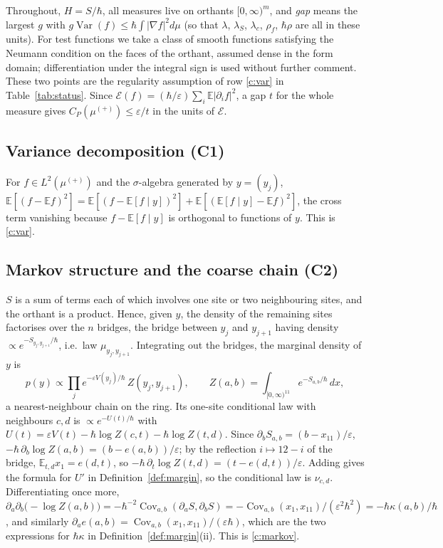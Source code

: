 \documentclass[11pt,a4paper]{article}
\theoremstyle{definition}
\theoremstyle{remark}
\newcommand{\hk}{\hbar\kappa}
\newcommand{\hr}{\hbar\rho}
\newcommand{\E}{\mathbb{E}}
\DeclareMathOperator{\Cov}{Cov}
\DeclareMathOperator{\Var}{Var}
\begin{document}
Throughout, $H=S/\hbar$, all measures live on orthants $[0,\infty)^m$, and \emph{gap} means the largest $g$ with $g\Var(f)\le\hbar\int|\nabla f|^2d\mu$ (so that $\lambda$, $\lambda_S$, $\lambda_c$, $\rho_f$, $\hr$ are all in these units). For test functions we take a class of smooth functions satisfying the Neumann condition on the faces of the orthant, assumed dense in the form domain; differentiation under the integral sign is used without further comment. These two points are the regularity assumption of row \ref{c:var} in Table~\ref{tab:status}. Since $\mathcal E(f)=(\hbar/\varepsilon)\sum_i\E|\partial_if|^2$, a gap $t$ for the whole measure gives $C_P(\mu^{(+)})\le\varepsilon/t$ in the units of $\mathcal E$.

\subsection{Variance decomposition (C1)}\label{app:var}
For $f\in L^2(\mu^{(+)})$ and the $\sigma$-algebra generated by $y=(y_j)$, $\E[(f-\E f)^2]=\E[(f-\E[f\mid y])^2]+\E[(\E[f\mid y]-\E f)^2]$, the cross term vanishing because $f-\E[f\mid y]$ is orthogonal to functions of $y$. This is \ref{c:var}.

\subsection{Markov structure and the coarse chain (C2)}\label{app:markov}
$S$ is a sum of terms each of which involves one site or two neighbouring sites, and the orthant is a product. Hence, given $y$, the density of the remaining sites factorises over the $n$ bridges, the bridge between $y_j$ and $y_{j+1}$ having density $\propto e^{-S_{y_j,y_{j+1}}/\hbar}$, i.e.\ law $\mu_{y_j,y_{j+1}}$. Integrating out the bridges, the marginal density of $y$ is
\[
p(y)\propto\prod_j e^{-\varepsilon V(y_j)/\hbar}\,Z(y_j,y_{j+1}),\qquad Z(a,b)=\int_{[0,\infty)^{11}}e^{-S_{a,b}/\hbar}\,dx,
\]
a nearest-neighbour chain on the ring. Its one-site conditional law with neighbours $c,d$ is $\propto e^{-U(t)/\hbar}$ with $U(t)=\varepsilon V(t)-\hbar\log Z(c,t)-\hbar\log Z(t,d)$. Since $\partial_bS_{a,b}=(b-x_{11})/\varepsilon$, $-\hbar\,\partial_b\log Z(a,b)=(b-e(a,b))/\varepsilon$; by the reflection $i\mapsto12-i$ of the bridge, $\E_{t,d}x_1=e(d,t)$, so $-\hbar\,\partial_t\log Z(t,d)=(t-e(d,t))/\varepsilon$. Adding gives the formula for $U'$ in Definition~\ref{def:margin}, so the conditional law is $\nu_{c,d}$. Differentiating once more, $\partial_a\partial_b\bigl(-\log Z(a,b)\bigr)=-\hbar^{-2}\Cov_{a,b}(\partial_aS,\partial_bS)=-\Cov_{a,b}(x_1,x_{11})/(\varepsilon^2\hbar^2)=-\hk(a,b)/\hbar$, and similarly $\partial_ae(a,b)=\Cov_{a,b}(x_1,x_{11})/(\varepsilon\hbar)$, which are the two expressions for $\hk$ in Definition~\ref{def:margin}(ii). This is \ref{c:markov}.
\end{document}
